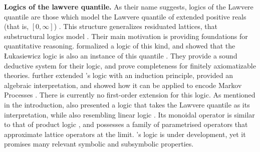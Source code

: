 
\textbf{Logics of the lawvere quantile.} As their name suggests, logics of the Lawvere quantile are those which model the Lawvere quantile of extended positive reals (that is, $[0,\infty]$)  \citep{bacci2023propositional}. This structure generalizes residuated lattices, that substructural logics model \citep{galatos2007residuated}. Their main motivation is providing foundations for quantitative reasoning. \citeauthor{bacci2023propositional} formalized a logic of this kind, and showed that the Łukasiewicz logic is also an instance of this quantile \citep{bacci2023propositional, bacci2024polynomial}. They provide a sound deductive system for their logic, and prove completeness for finitely axiomatizable theories. \citeauthor{bacci2025induction} further extended \citeauthor{bacci2024polynomial}'s logic with an induction principle, provided an algebraic interpretation, and showed how it can be applied to encode Markov Processes \citep{bacci2025induction}. There is currently no first-order extension for this logic. As mentioned in the introduction, \citeauthor{capucci2024quantifiers} also presented a logic that takes the Lawvere quantile as its interpretation, while also resembling linear logic \citep{Wadler1993, agliano2025algebraic}. Its monoidal operator is similar to that of product logic \cite{cintula2011handbook, prooffuzzy}, and possesses a family of parametrised operators that approximate lattice operators at the limit. \citeauthor{capucci2024quantifiers}'s logic is under development, yet it promises many relevant symbolic and subsymbolic properties.


